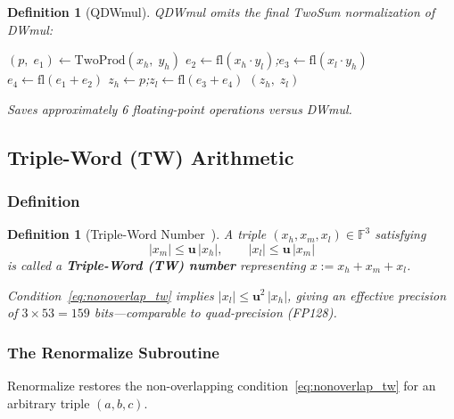 \documentclass[12pt,a4paper]{article}
\newtheorem{definition}[theorem]{Definition}
\newcommand{\fl}{\mathrm{fl}}
\newcommand{\uu}{\mathbf{u}}
\newcommand{\FF}{\mathbb{F}}
\begin{document}
\begin{definition}[QDWmul]
QDWmul omits the final TwoSum normalization of DWmul:

\begin{algorithm}[H]
\caption{$\mathrm{QDWmul}(x_h, x_l,\; y_h, y_l) \to (z_h,\, z_l)$}
\begin{algorithmic}[1]
\State $(p,\; e_1) \leftarrow \mathrm{TwoProd}(x_h,\; y_h)$
\State $e_2 \leftarrow \fl(x_h \cdot y_l)$;\quad $e_3 \leftarrow \fl(x_l \cdot y_h)$
\State $e_4 \leftarrow \fl(e_1 + e_2)$
\State $z_h \leftarrow p$;\quad $z_l \leftarrow \fl(e_3 + e_4)$
\State \Return $(z_h,\; z_l)$
\end{algorithmic}
\end{algorithm}
Saves approximately 6 floating-point operations versus DWmul.
\end{definition}

\subsection{Triple-Word (TW) Arithmetic}
\label{sec:tw}

\subsubsection{Definition}

\begin{definition}[Triple-Word Number~\cite{Fabiano2019}]
A triple $(x_h, x_m, x_l) \in \FF^3$ satisfying
\begin{equation}
  |x_m| \leq \uu\,|x_h|, \qquad |x_l| \leq \uu\,|x_m|
  \label{eq:nonoverlap_tw}
\end{equation}
is called a \textbf{Triple-Word (TW) number} representing $x := x_h + x_m + x_l$.

Condition~\eqref{eq:nonoverlap_tw} implies $|x_l| \leq \uu^2\,|x_h|$,
giving an effective precision of $3 \times 53 = 159$ bits---comparable to quad-precision (FP128).
\end{definition}

\subsubsection{The Renormalize Subroutine}

Renormalize restores the non-overlapping condition~\eqref{eq:nonoverlap_tw}
for an arbitrary triple $(a, b, c)$.
\end{document}
